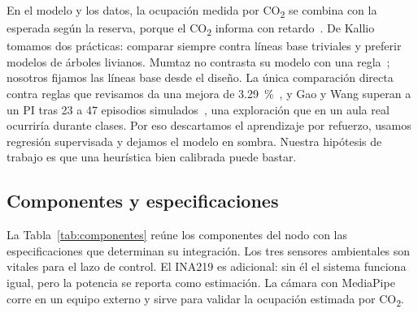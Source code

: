\documentclass[manuscript,screen,nonacm,natbib=false]{acmart}
\newcommand{\COdos}{CO\textsubscript{2}}
\begin{document}
En el modelo y los datos, la ocupación medida por \COdos{} se combina con la esperada según la reserva, porque el \COdos{} informa con retardo~\cite{franco2020co2,kallio2021forecasting}. De Kallio~\cite{kallio2021forecasting} tomamos dos prácticas: comparar siempre contra líneas base triviales y preferir modelos de árboles livianos. Mumtaz no contrasta su modelo con una regla~\cite{mumtaz2021iot}; nosotros fijamos las líneas base desde el diseño. La única comparación directa contra reglas que revisamos da una mejora de 3.29~\%~\cite{kumkam2025comparative}, y Gao y Wang superan a un PI tras 23 a 47 episodios simulados~\cite{gao2023comparative}, una exploración que en un aula real ocurriría durante clases. Por eso descartamos el aprendizaje por refuerzo, usamos regresión supervisada y dejamos el modelo en sombra. Nuestra hipótesis de trabajo es que una heurística bien calibrada puede bastar.

\subsection{Componentes y especificaciones}
La Tabla~\ref{tab:componentes} reúne los componentes del nodo con las especificaciones que determinan su integración. Los tres sensores ambientales son vitales para el lazo de control. El INA219 es adicional: sin él el sistema funciona igual, pero la potencia se reporta como estimación. La cámara con MediaPipe corre en un equipo externo y sirve para validar la ocupación estimada por \COdos{}.
\end{document}
